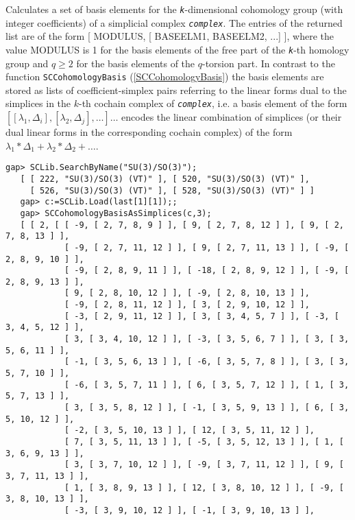 \documentclass[a4paper,11pt]{report}
\begin{document}
{{{ Calculates a set of basis elements for the \mbox{\texttt{\mdseries\slshape k}}-dimensional cohomology group (with integer coefficients) of a simplicial
complex \mbox{\texttt{\mdseries\slshape complex}}. The entries of the returned list are of the form [ MODULUS, [ BASEELM1,
BASEELM2, ...] ], where the value MODULUS is 1 for the basis elements of the
free part of the \mbox{\texttt{\mdseries\slshape k}}-th homology group and $q\geq 2$ for the basis elements of the $q$-torsion part. In contrast to the function \texttt{SCCohomologyBasis} (\ref{SCCohomologyBasis}) the basis elements are stored as lists of coefficient-simplex pairs referring
to the linear forms dual to the simplices in the $k$-th cochain complex of \mbox{\texttt{\mdseries\slshape complex}}, i.e. a basis element of the form $[ [ \lambda_1, \Delta_i], [\lambda_2, \Delta_j], \dots ] \dots$ encodes the linear combination of simplices (or their dual linear forms in the
corresponding cochain complex) of the form $\lambda_1*\Delta_1+\lambda_2*\Delta_2 + \dots$. 
\begin{Verbatim}[commandchars=!@|,fontsize=\small,frame=single,label=Example]
   gap> SCLib.SearchByName("SU(3)/SO(3)");   
   [ [ 222, "SU(3)/SO(3) (VT)" ], [ 520, "SU(3)/SO(3) (VT)" ], 
     [ 526, "SU(3)/SO(3) (VT)" ], [ 528, "SU(3)/SO(3) (VT)" ] ]
   gap> c:=SCLib.Load(last[1][1]);;
   gap> SCCohomologyBasisAsSimplices(c,3);
   [ [ 2, [ [ -9, [ 2, 7, 8, 9 ] ], [ 9, [ 2, 7, 8, 12 ] ], [ 9, [ 2, 7, 8, 13 ] ], 
            [ -9, [ 2, 7, 11, 12 ] ], [ 9, [ 2, 7, 11, 13 ] ], [ -9, [ 2, 8, 9, 10 ] ],
            [ -9, [ 2, 8, 9, 11 ] ], [ -18, [ 2, 8, 9, 12 ] ], [ -9, [ 2, 8, 9, 13 ] ],
            [ 9, [ 2, 8, 10, 12 ] ], [ -9, [ 2, 8, 10, 13 ] ], 
            [ -9, [ 2, 8, 11, 12 ] ], [ 3, [ 2, 9, 10, 12 ] ], 
            [ -3, [ 2, 9, 11, 12 ] ], [ 3, [ 3, 4, 5, 7 ] ], [ -3, [ 3, 4, 5, 12 ] ], 
            [ 3, [ 3, 4, 10, 12 ] ], [ -3, [ 3, 5, 6, 7 ] ], [ 3, [ 3, 5, 6, 11 ] ], 
            [ -1, [ 3, 5, 6, 13 ] ], [ -6, [ 3, 5, 7, 8 ] ], [ 3, [ 3, 5, 7, 10 ] ], 
            [ -6, [ 3, 5, 7, 11 ] ], [ 6, [ 3, 5, 7, 12 ] ], [ 1, [ 3, 5, 7, 13 ] ], 
            [ 3, [ 3, 5, 8, 12 ] ], [ -1, [ 3, 5, 9, 13 ] ], [ 6, [ 3, 5, 10, 12 ] ], 
            [ -2, [ 3, 5, 10, 13 ] ], [ 12, [ 3, 5, 11, 12 ] ], 
            [ 7, [ 3, 5, 11, 13 ] ], [ -5, [ 3, 5, 12, 13 ] ], [ 1, [ 3, 6, 9, 13 ] ], 
            [ 3, [ 3, 7, 10, 12 ] ], [ -9, [ 3, 7, 11, 12 ] ], [ 9, [ 3, 7, 11, 13 ] ],
            [ 1, [ 3, 8, 9, 13 ] ], [ 12, [ 3, 8, 10, 12 ] ], [ -9, [ 3, 8, 10, 13 ] ],
            [ -3, [ 3, 9, 10, 12 ] ], [ -1, [ 3, 9, 10, 13 ] ], 

\end{Verbatim}}}}
\end{document}
